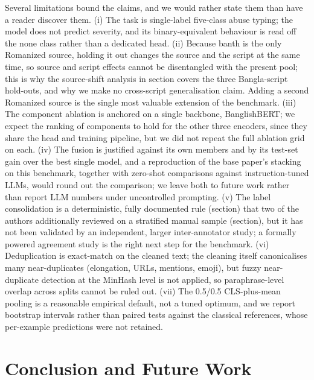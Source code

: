 \documentclass[11pt,a4paper]{article}
\def\dset#1{#1}%
\def\cref#1{section}%
\def\textsc#1{#1}%
\def\emph#1{#1}%
\providecommand{\dset}[1]{\textsc{#1}}
\begin{document}
Several limitations bound the claims, and we would rather state them than have a reader discover them. \emph{(i)} The task is single-label five-class abuse typing; the model does not predict severity, and its binary-equivalent behaviour is read off the \emph{none} class rather than a dedicated head. \emph{(ii)} Because \dset{banth} is the only Romanized source, holding it out changes the source and the script at the same time, so source and script effects cannot be disentangled with the present pool; this is why the source-shift analysis in \cref{sec:robustness-results} covers the three Bangla-script hold-outs, and why we make no cross-script generalisation claim. Adding a second Romanized source is the single most valuable extension of the benchmark. \emph{(iii)} The component ablation is anchored on a single backbone, BanglishBERT; we expect the ranking of components to hold for the other three encoders, since they share the head and training pipeline, but we did not repeat the full ablation grid on each. \emph{(iv)} The fusion is justified against its own members and by its test-set gain over the best single model, and a reproduction of the base paper's stacking on this benchmark, together with zero-shot comparisons against instruction-tuned LLMs, would round out the comparison; we leave both to future work rather than report LLM numbers under uncontrolled prompting. \emph{(v)} The label consolidation is a deterministic, fully documented rule (\cref{tab:consolidation}) that two of the authors additionally reviewed on a stratified manual sample (\cref{sec:taxonomy}), but it has not been validated by an independent, larger inter-annotator study; a formally powered agreement study is the right next step for the benchmark. \emph{(vi)} Deduplication is exact-match on the cleaned text; the cleaning itself canonicalises many near-duplicates (elongation, URLs, mentions, emoji), but fuzzy near-duplicate detection at the MinHash level is not applied, so paraphrase-level overlap across splits cannot be ruled out. \emph{(vii)} The 0.5/0.5 CLS-plus-mean pooling is a reasonable empirical default, not a tuned optimum, and we report bootstrap intervals rather than paired tests against the classical references, whose per-example predictions were not retained.

\section{Conclusion and Future Work}
\label{sec:conclusion}
\end{document}
